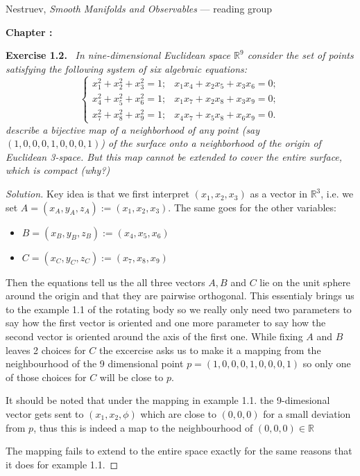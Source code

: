 \documentclass[11pt,a4paper]{article}
\author{Aleksandras}
\date{\today}
\makeatletter
\newcommand{\dg@chapnum}{}
\newcommand{\dg@chaptitle}{}
\renewcommand{\maketitle}{%
  \begin{center}
    {\small Nestruev, \emph{Smooth Manifolds and Observables} --- reading group}\par
    \vspace{0.6em}
    {\Large\bfseries Chapter \dg@chapnum: \dg@chaptitle}\par
    \vspace{0.4em}
    {\normalsize \@author}\par
    {\small \@date}\par
  \end{center}
  \vspace{1em}}
\theoremstyle{plain}
\theoremstyle{definition}
\theoremstyle{remark}
\newenvironment{exercise}[1]
  {\par\medskip\noindent\textbf{Exercise #1.}\ \itshape}
  {\par\medskip}
\newenvironment{solution}
  {\begin{proof}[Solution]}
  {\end{proof}}
\newcommand{\R}{\mathbb{R}}
\makeatother
\begin{document}
\maketitle

\begin{exercise}{1.2}
In nine-dimensional Euclidean space $\mathbb{R}^9$ consider the set of points
satisfying the following system of six algebraic equations:
\[
\begin{cases}
x_1^2 + x_2^2 + x_3^2 = 1; & x_1x_4 + x_2x_5 + x_3x_6 = 0;\\
x_4^2 + x_5^2 + x_6^2 = 1; & x_1x_7 + x_2x_8 + x_3x_9 = 0;\\
x_7^2 + x_8^2 + x_9^2 = 1; & x_4x_7 + x_5x_8 + x_6x_9 = 0.
\end{cases}
\]
 describe a bijective map of a neighborhood of any
point (say $(1, 0, 0, 0, 1, 0, 0, 0, 1)$) of the surface onto a neighborhood of the
origin of Euclidean 3-space. But this map cannot be extended to cover the
entire surface, which is compact (why?)
\end{exercise}

\begin{solution}
  Key idea is that we first interpret $(x_1, x_2, x_3)$ as a vector in $\R^3$, i.e. we set $A=(x_A, y_A, z_A):=(x_1, x_2, x_3)$. The same goes for the other variables:
  \begin{itemize}
    \item $B=(x_B, y_B, z_B):=(x_4, x_5, x_6)$
    \item  $C=(x_C, y_C, z_C):=(x_7, x_8, x_9)$
  \end{itemize}

  Then the equations tell us the all three vectors $A,B$ and $C$ lie on the unit sphere around the origin and that they are pairwise orthogonal. This essentialy brings us to the example 1.1 of the rotating body so we really only need two parameters to say how the first vector is oriented and one more parameter to say how the second vector is oriented around the axis of the first one. While fixing $A$ and $B$ leaves 2 choices for $C$ the excercise asks us to make it a mapping from the neighbourhood of the 9 dimensional point  $p=(1, 0, 0, 0, 1, 0, 0, 0, 1)$ so only one of those choices for $C$ will be close to $p$.

  It should be noted that under the mapping in example 1.1. the 9-dimesional vector gets sent to $(x_1, x_2, \phi)$ which are close to $(0,0,0)$ for a small deviation from $p$, thus this is indeed a map to the neighbourhood of $(0,0,0)\in \R$

  The mapping fails to extend to the entire space exactly for the same reasons that it does for example 1.1.

  \end{solution}
  
\end{document}
